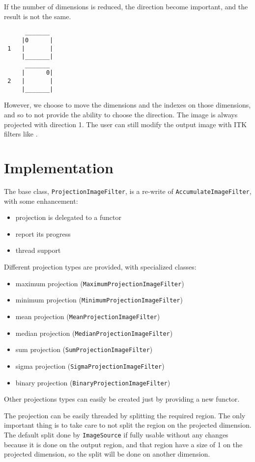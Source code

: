 \documentclass{InsightArticle}
\begin{document}
If the number of dimensions is reduced, the direction become important,
and the result is not the same.
 
\small \begin{verbatim}
      _______
     |0      |
 1   |       |
     |_______|
      _______
     |      0|
 2   |       |
     |_______|
\end{verbatim} \normalsize
 
However, we choose to move the dimensions and the indexes on those
dimensions, and so to not provide the ability to choose the direction.
The image is always projected with direction 1.
The user can still modify the output image with ITK filters like
.

\section{Implementation}

The base class, \verb$ProjectionImageFilter$, is a re-write of
\verb$AccumulateImageFilter$, with some enhancement:
\begin{itemize}
  \item projection is delegated to a functor
  \item report its progress
  \item thread support
\end{itemize}
Different projection types are provided, with specialized classes:
\begin{itemize}
  \item maximum projection (\verb$MaximumProjectionImageFilter$)
  \item minimum projection (\verb$MinimumProjectionImageFilter$)
  \item mean projection (\verb$MeanProjectionImageFilter$)
  \item median projection (\verb$MedianProjectionImageFilter$)
  \item sum projection (\verb$SumProjectionImageFilter$)
  \item sigma projection (\verb$SigmaProjectionImageFilter$)
  \item binary projection (\verb$BinaryProjectionImageFilter$)
\end{itemize}
Other projections types can easily be created just by providing a new functor.

The projection can be easily threaded by splitting the required region. The
only important thing is to take care to not split the region on the projected
dimension.
The default split done by \verb$ImageSource$ if fully usable without any changes
because it is done on the output region, and that region have a size of 1 on
the projected dimension, so the split will be done on another dimension.
\end{document}
